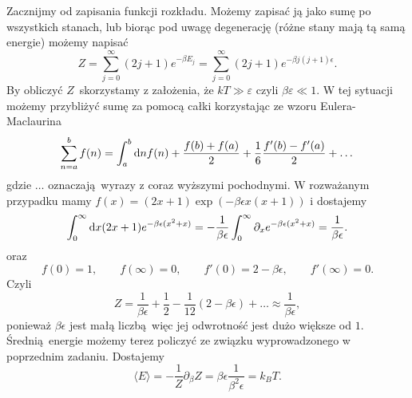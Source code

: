 \documentclass[11pt,a4paper]{article}
\begin{document}
Zacznijmy od zapisania funkcji rozkładu. Możemy zapisać ją jako sumę po wszystkich stanach, lub biorąc pod uwagę degenerację (różne stany mają tą samą energie) możemy napisać
\begin{equation}
	Z = \sum_{j=0}^{\infty} (2j+1) e^{-\beta E_j} = \sum_{j=0}^{\infty} (2j+1) e^{-\beta j(j+1) \epsilon}.
\end{equation}
By obliczyć $Z$ skorzystamy z założenia, że $kT \gg \varepsilon$ czyli $\beta \varepsilon \ll 1$. W tej sytuacji możemy przybliżyć sumę za pomocą całki korzystając ze wzoru Eulera-Maclaurina
\begin{equation}
	\sum_{n=a}^b f(n) = \int_{a}^b {\rm d}n f(n) + \frac{f(b) + f(a)}{2} + \frac{1}{6} \frac{f'(b) - f'(a)}{2} + \dots
\end{equation}
gdzie $\dots$ oznaczają wyrazy z coraz wyższymi pochodnymi. W rozważanym przypadku mamy $f(x) = (2x+1) \exp(-\beta \epsilon x(x+1))$ i dostajemy
\begin{equation}
	\int_0^{\infty} {\rm d}x (2x +1) e^{- \beta \epsilon (x^2+x)} = - \frac{1}{\beta \epsilon} \int_{0}^{\infty} \partial_x e^{-\beta \epsilon (x^2+x)} = \frac{1}{\beta \epsilon}.
\end{equation}
oraz
\begin{equation}
	f(0) = 1, \qquad f(\infty) = 0, \qquad f'(0) = 2 - \beta \epsilon, \qquad f'(\infty) = 0.
\end{equation}
Czyli
\begin{equation}
	Z = \frac{1}{\beta \epsilon} + \frac{1}{2} - \frac{1}{12}(2 - \beta \epsilon) + \dots \approx \frac{1}{\beta \epsilon},
\end{equation}
ponieważ $\beta \epsilon$ jest małą liczbą więc jej odwrotność jest dużo większe od $1$. Średnią energie możemy terez policzyć ze związku wyprowadzonego w poprzednim zadaniu. Dostajemy
\begin{equation}
	\langle E \rangle = - \frac{1}{Z} \partial_{\beta} Z = \beta \epsilon \frac{1}{\beta^2\epsilon} = k_B T.
\end{equation}
\end{document}
